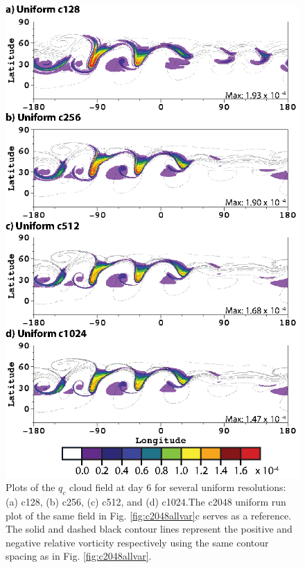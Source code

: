 \documentclass{ametsoc}
\begin{document}
\begin{figure}
   \centerline{%
   \noindent
   \includegraphics[height=.9\textheight]{Figures/A_qc_uniform-01}}
   \caption{Plots of the $q_c$ cloud field at day 6 for several 
   uniform resolutions: (a) c128, (b) c256, (c) c512, and (d) c1024.The c2048 uniform run
   plot of the same field in Fig. \ref{fig:c2048allvar}c serves as a reference. 
   The solid and dashed black contour
   lines represent the positive and negative relative vorticity respectively using the
   same contour spacing as in Fig. \ref{fig:c2048allvar}.
   }
   \label{fig:uniformqc}
\end{figure}
\end{document}
